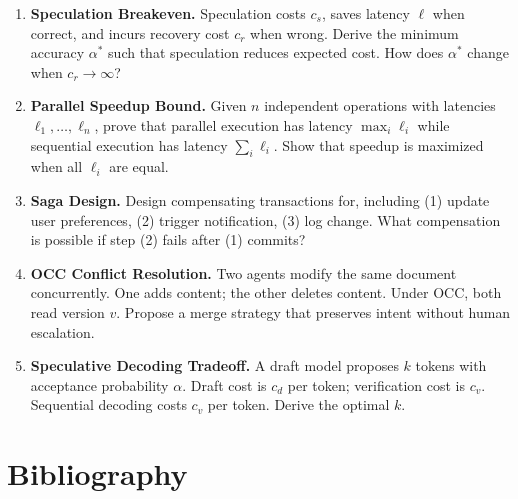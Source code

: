 \begin{enumerate}
\item \textbf{Speculation Breakeven.}  
Speculation costs $c_s$, saves latency $\ell$ when correct, and incurs recovery cost $c_r$ when wrong. Derive the minimum accuracy $\alpha^*$ such that speculation reduces expected cost. How does $\alpha^*$ change when $c_r \rightarrow \infty$?

\item \textbf{Parallel Speedup Bound.}  
Given $n$ independent operations with latencies $\ell_1,\dots,\ell_n$, prove that parallel execution has latency $\max_i \ell_i$ while sequential execution has latency $\sum_i \ell_i$. Show that speedup is maximized when all $\ell_i$ are equal.

\item \textbf{Saga Design.}  
Design compensating transactions for, including (1) update user preferences, (2) trigger notification, (3) log change. What compensation is possible if step (2) fails after (1) commits?

\item \textbf{OCC Conflict Resolution.}  
Two agents modify the same document concurrently. One adds content; the other deletes content. Under OCC, both read version $v$. Propose a merge strategy that preserves intent without human escalation.

\item \textbf{Speculative Decoding Tradeoff.}  
A draft model proposes $k$ tokens with acceptance probability $\alpha$. Draft cost is $c_d$ per token; verification cost is $c_v$. Sequential decoding costs $c_v$ per token. Derive the optimal $k$.
\end{enumerate}

\section*{Bibliography}

